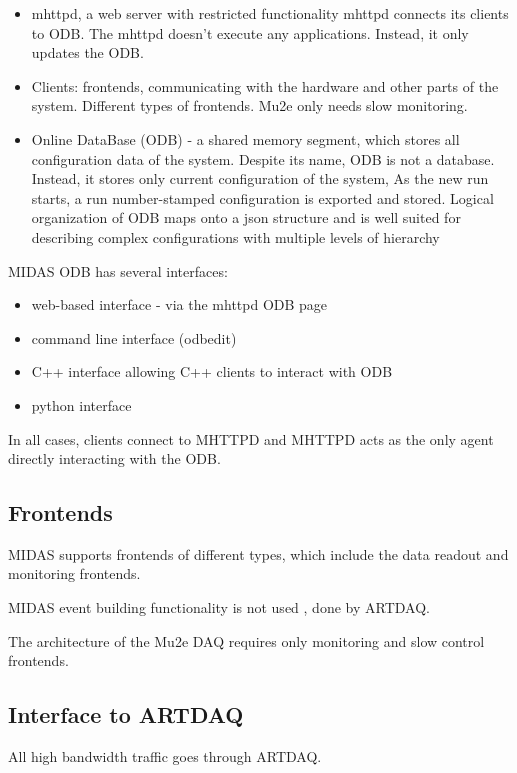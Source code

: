 \begin{itemize}
\item 
  mhttpd, a web server with restricted functionality
  mhttpd connects its clients to ODB. 
  The mhttpd doesn't execute any applications. Instead, it only updates the ODB.
\item
  Clients: frontends, communicating with the hardware and other
  parts of the system. Different types of frontends. Mu2e only needs slow monitoring.
\item
  Online DataBase (ODB) - a shared memory segment, which stores all configuration data of the system. Despite its name, ODB is not a database. Instead, it stores only current configuration
  of the system, As the new run starts, a run number-stamped configuration is exported and stored.
  Logical organization of ODB maps onto a json structure and is well suited for describing
  complex configurations with multiple levels of hierarchy
\end{itemize}

MIDAS ODB has several interfaces:
\begin{itemize}
\item 
  web-based interface - via the mhttpd ODB page
\item
  command line interface (odbedit)
\item
  C++ interface allowing C++ clients to interact with ODB
\item
  python interface
\end{itemize}

In all cases, clients connect to MHTTPD and MHTTPD acts as
the only agent directly interacting with the ODB.

\subsection{Frontends}

MIDAS supports frontends of different types, which include the data readout and monitoring
frontends.

MIDAS event building functionality is not used , done by ARTDAQ.

The architecture of the Mu2e DAQ requires only monitoring and slow control frontends.


\subsection{Interface to ARTDAQ}
All high bandwidth traffic goes through ARTDAQ.

